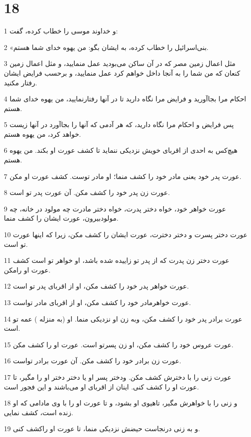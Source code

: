 \chapter{18}

\par 1 و خداوند موسی را خطاب کرده، گفت:
\par 2 «بنی‌اسرائیل را خطاب کرده، به ایشان بگو: من یهوه خدای شما هستم.
\par 3 مثل اعمال زمین مصر که در آن ساکن می‌بودید عمل منمایید، و مثل اعمال زمین کنعان که من شما را به آنجا داخل خواهم کرد عمل منمایید، و برحسب فرایض ایشان رفتار مکنید.
\par 4 احکام مرا بجاآورید و فرایض مرا نگاه دارید تا در آنها رفتارنمایید، من یهوه خدای شما هستم.
\par 5 پس فرایض و احکام مرا نگاه دارید، که هر آدمی که آنها را بجاآورد در آنها زیست خواهد کرد، من یهوه هستم. 
\par 6 هیچ‌کس به احدی از اقربای خویش نزدیکی ننماید تا کشف عورت او بکند. من یهوه هستم.
\par 7 عورت پدر خود یعنی مادر خود را کشف منما؛ او مادر توست. کشف عورت او مکن.
\par 8 عورت زن پدر خود را کشف مکن. آن عورت پدر تو است.
\par 9 عورت خواهر خود، خواه دختر پدرت، خواه دختر مادرت چه مولود در خانه، چه مولودبیرون، عورت ایشان را کشف منما.
\par 10 عورت دختر پسرت و دختر دخترت، عورت ایشان را کشف مکن، زیرا که اینها عورت تو است.
\par 11 عورت دختر زن پدرت که از پدر تو زاییده شده باشد، او خواهر تو است کشف عورت او رامکن.
\par 12 عورت خواهر پدر خود را کشف مکن، او از اقربای پدر تو است.
\par 13 عورت خواهرمادر خود را کشف مکن، او از اقربای مادر تواست.
\par 14 عورت برادر پدر خود را کشف مکن، وبه زن او نزدیکی منما. او (به منزله ) عمه تو است.
\par 15 عورت عروس خود را کشف مکن، او زن پسرتو است. عورت او را کشف مکن.
\par 16 عورت زن برادر خود را کشف مکن. آن عورت برادر تواست.
\par 17 عورت زنی را با دخترش کشف مکن. ودختر پسر او یا دختر دختر او را مگیر، تا عورت او را کشف کنی. اینان از اقربای او می‌باشند و این فجور است.
\par 18 و زنی را با خواهرش مگیر، تاهیوی او بشود، و تا عورت او را با وی مادامی که او زنده است، کشف نمایی.
\par 19 و به زنی درنجاست حیضش نزدیکی منما، تا عورت او راکشف کنی.
